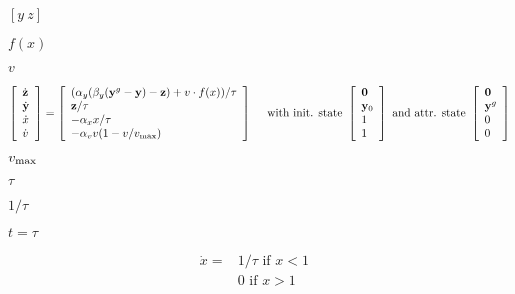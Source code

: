 \documentclass{article}
\begin{document}
$[y~z]$
\pagebreak

$ f(x) $
\pagebreak

$ v $
\pagebreak

\begin{eqnarray*} \left[ \begin{array}{l} {\dot{\mathbf{z}}} \\ {\dot{\mathbf{y}}} \\ {\dot{x}} \\ {\dot{v}} \end{array} \right] = \left[ \begin{array}{l} (\alpha_y (\beta_y({\mathbf{y}}^{g}-\mathbf{y})-\mathbf{z}) + v\cdot f(x))/\tau \\ \mathbf{z}/\tau \\ -\alpha_x x/\tau \\ -\alpha_v v (1-v/v_{\mbox{\scriptsize max}}) \end{array} \right] \mbox{~~~~with init. state~} \left[ \begin{array}{l} \mathbf{0} \\ \mathbf{y}_0 \\ 1 \\ 1 \end{array} \right] \mbox{~and attr. state~} \left[ \begin{array}{l} \mathbf{0} \\ \mathbf{y}^g \\ 0 \\ 0 \end{array} \right] \end{eqnarray*}
\pagebreak

$ v_{\mbox{\scriptsize max}}$
\pagebreak

$\tau $
\pagebreak

$1/\tau$
\pagebreak

$t=\tau$
\pagebreak

\begin{eqnarray*} \dot{x} =& 1/\tau \mbox{~if~} x < 1 & \\ & 0 \mbox{~if~} x>1 \\ \end{eqnarray*}
\pagebreak
\end{document}
